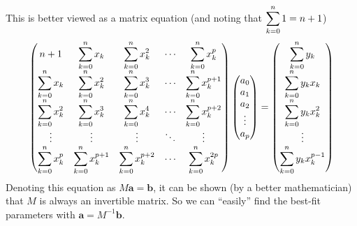 This is better viewed as a matrix equation (and noting that $\displaystyle\sum_{k=0}^n 1 = n+1$)
\begin{align*}
\begin{pmatrix}
n+1 & \dsum_{k=0}^n x_k & \dsum_{k=0}^n  x_k^2 & \cdots & \dsum_{k=0}^n  x_k^p   \\
%
\dsum_{k=0}^n x_k & \dsum_{k=0}^n x_k^2 & \dsum_{k=0}^n  x_k^3 & \cdots & \dsum_{k=0}^n  x_k^{p+1}   \\
%
\dsum_{k=0}^n x_k^2 & \dsum_{k=0}^n x_k^3 & \dsum_{k=0}^n  x_k^4 & \cdots & \dsum_{k=0}^n  x_k^{p+2}  \\
\vdots & \vdots & \vdots & \ddots & \vdots \\
%
\dsum_{k=0}^n x_k^p & \dsum_{k=0}^n x_k^{p+1} & \dsum_{k=0}^n  x_k^{p+2} & \cdots & \dsum_{k=0}^n  x_k^{2p}
\end{pmatrix}
%
\begin{pmatrix}
a_0 \\ a_1 \\ a_2 \\ \vdots \\ a_p
\end{pmatrix}
%
=
%
\begin{pmatrix}
\dsum_{k=0}^n y_k \\ \dsum_{k=0}^n y_k x_k \\ \dsum_{k=0}^n y_k x_k^2 \\ \vdots \\ \dsum_{k=0}^n y_k x_k^{p-1}
\end{pmatrix}
\end{align*}
Denoting this equation as $M \mathbf{a} = \mathbf{b}$, it can be shown (by a better mathematician) that $M$ is always an invertible matrix. So we can ``easily'' find the best-fit parameters with $\mathbf{a} = M^{-1} \mathbf{b}$.


